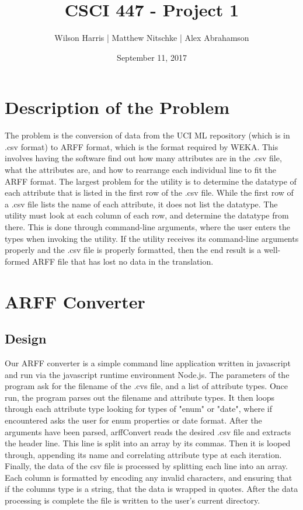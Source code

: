 \documentclass[11pt]{article} %
\title{\textbf{CSCI 447 - Project 1}}
\author{Wilson Harris | Matthew Nitschke | Alex Abrahamson }
\date{September 11, 2017}
\begin{document}
\maketitle

\section{Description of the Problem}
The problem is the conversion of data from the UCI ML repository (which is in .csv format) to ARFF format, which is the format required by WEKA. This involves having the software find out how many attributes are in the .csv file, what the attributes are, and how to rearrange each individual line to fit the ARFF format. The largest problem for the utility is to determine the datatype of each attribute that is listed in the first row of the .csv file. While the first row of a .csv file lists the name of each attribute, it does not list the datatype. The utility must look at each column of each row, and determine the datatype from there. This is done through command-line arguments, where the user enters the types when invoking the utility. If the utility receives its command-line arguments properly and the .csv file is properly formatted, then the end result is a well-formed ARFF file that has lost no data in the translation.

\section{ARFF Converter}

\subsection{Design}
Our ARFF converter is a simple command line application written in javascript and run via the javascript runtime environment Node.js. The parameters of the program ask for the filename of the .cvs file, and a list of attribute types. Once run, the program parses out the filename and attribute types. It then loops through each attribute type looking for types of "enum" or "date", where if encountered asks the user for enum properties or date format. After the arguments have been parsed, arffConvert reads the desired .csv file and extracts the header line. This line is split into an array by its commas.  Then it is looped through, appending its name and correlating attribute type at each iteration. Finally, the data of the csv file is processed by splitting each line into an array. Each column is formatted by encoding any invalid characters, and ensuring that if the columns type is a string, that the data is wrapped in quotes. After the data processing is complete the file is written to the user's current directory.
\end{document}

